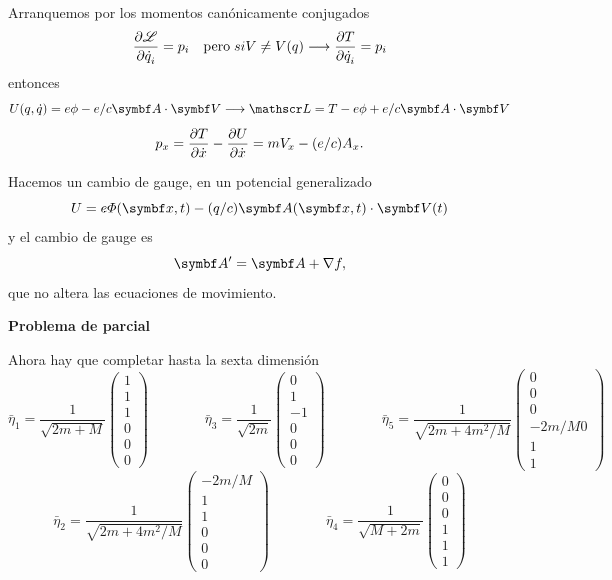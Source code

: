\documentclass[10pt,oneside]{CBFT_book}
\begin{document}
Arranquemos por los momentos canónicamente conjugados
\[
	\frac{\partial^{\hspace{-0.05em}} {\mathscr{L}}}{\partial {\dot{q}_i}^{\hspace{-0.05em}}} = p_i \quad \textrm{pero} \; si V \neq V(q) \longrightarrow \frac{\partial^{\hspace{-0.05em}} {T}}{\partial {\dot{q}_i}^{\hspace{-0.05em}}} = p_i
\]
entonces
\[
	U(q,\dot{q}) =  e \phi - e/c \vb{A}\cdot\vb{V} \longrightarrow \Lag = T - e \phi + e/c  \vb{A}\cdot\vb{V}
\]
\[
	p_x = \frac{\partial^{\hspace{-0.05em}} {T}}{\partial {\dot{x}}^{\hspace{-0.05em}}} - \frac{\partial^{\hspace{-0.05em}} {U}}{\partial {\dot{x}}^{\hspace{-0.05em}}} = m V_x - (e/c) A_x.
\]

Hacemos un cambio de gauge, en un potencial generalizado
\[
	U =  e \Phi(\vb{x},t) - (q/c) \vb{A}(\vb{x},t)\cdot\vb{V}(t)
\]
y el cambio de gauge es
\[
	\vb{A}' = \vb{A} + \nabla f,
\]
que no altera las ecuaciones de movimiento.


\begin{ejemplo}{\bf Problema de parcial}
 
 
Ahora hay que completar hasta la sexta dimensión
\[
	\bar{\eta}_1 = \frac{1}{\sqrt{2m+M}} \begin{pmatrix} 1 \\ 1 \\ 1 \\ 0 \\ 0 \\ 0
	                                     \end{pmatrix} \qquad \qquad
	\bar{\eta}_3 = \frac{1}{\sqrt{2m}} \begin{pmatrix} 0 \\ 1 \\ -1 \\ 0 \\ 0 \\ 0
	                                     \end{pmatrix} \qquad \qquad
	\bar{\eta}_5 = \frac{1}{\sqrt{2m + 4m^2/M}} \begin{pmatrix} 0 \\ 0 \\ 0 \\ -2m/M0 \\ 1 \\ 1
	                                     \end{pmatrix}
\]
\[
	\bar{\eta}_2 = \frac{1}{\sqrt{2m+ 4m^2/M}} \begin{pmatrix} -2m/M \\ 1 \\ 1 \\ 0 \\ 0 \\ 0
	                                     \end{pmatrix} \qquad \qquad
	\bar{\eta}_4 = \frac{1}{\sqrt{M + 2m}} \begin{pmatrix} 0 \\ 0 \\ 0 \\ 1 \\ 1 \\ 1

\end{pmatrix}\]
\end{ejemplo}
\end{document}
